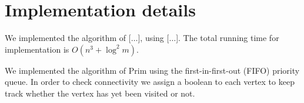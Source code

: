 \documentclass{tufte-handout}
\begin{document}
  \section{Implementation details}

  We implemented the algorithm of [$\ldots$], using [$\ldots$].%
  The total running time for implementation is $O(n^3+\log^2 m)$.
    
    We implemented the algorithm of Prim using the first-in-first-out (FIFO) priority queue. In order to check connectivity we assign a boolean to each vertex to keep track whether the vertex has yet been visited or not.
\end{document}
